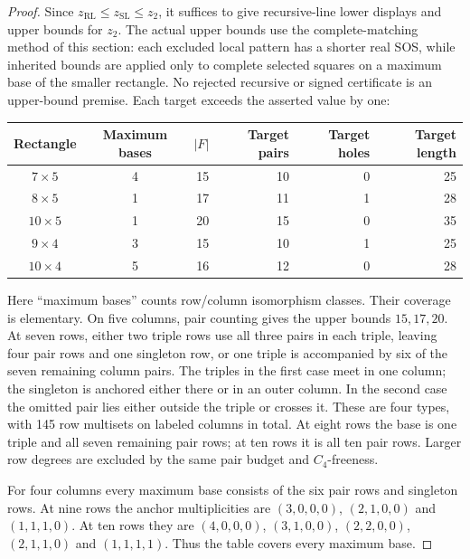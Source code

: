 \documentclass[11pt,a4paper]{article}
\theoremstyle{definition}
\newcommand{\zr}{z_{\mathrm{RL}}}
\newcommand{\zs}{z_{\mathrm{SL}}}
\newcommand{\zt}{z_2}
\begin{document}
\begin{proof}
Since $\zr\le\zs\le\zt$, it suffices to give recursive-line lower
displays and upper bounds for $\zt$. The actual upper
bounds use the complete-matching method of this section: each excluded
local pattern has a shorter real SOS, while inherited bounds are applied
only to complete selected squares on a maximum base of the smaller
rectangle. No rejected recursive or signed certificate is an upper-bound
premise. Each target exceeds the asserted value by one:
\begin{center}
\begin{tabular}{ccrrrr}
\toprule
Rectangle&Maximum bases&$|F|$&Target pairs&Target holes&Target length\\
\midrule
$7\times5$&4&15&10&0&25\\
$8\times5$&1&17&11&1&28\\
$10\times5$&1&20&15&0&35\\
$9\times4$&3&15&10&1&25\\
$10\times4$&5&16&12&0&28\\
\bottomrule
\end{tabular}
\end{center}

Here ``maximum bases'' counts row/column isomorphism classes. Their
coverage is elementary. On five columns, pair counting gives the upper
bounds $15,17,20$. At seven rows, either two triple rows use all three
pairs in each triple, leaving four pair rows and one singleton row, or
one triple is accompanied by six of the seven remaining column pairs.
The triples in the first case meet in one column; the singleton is
anchored either there or in an outer column. In the second case the
omitted pair lies either outside the triple or crosses it. These are
four types, with 145 row multisets on labeled columns in total. At eight
rows the base is one triple and all seven remaining pair rows; at ten
rows it is all ten pair rows. Larger row degrees are excluded by the
same pair budget and $C_4$-freeness.

For four columns every maximum base consists of the six pair rows and
singleton rows. At nine rows the anchor multiplicities are
$(3,0,0,0)$, $(2,1,0,0)$ and $(1,1,1,0)$. At ten rows they are
$(4,0,0,0)$, $(3,1,0,0)$, $(2,2,0,0)$, $(2,1,1,0)$ and $(1,1,1,1)$. Thus the table covers every maximum base.


\end{proof}
\end{document}
